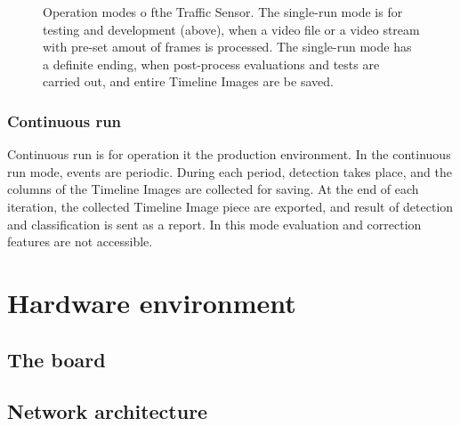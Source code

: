 \begin{figure}[!h]
	\centering
	
	\caption{Operation modes o fthe Traffic Sensor. The single-run mode is for testing and development (above), when a video file or a video stream with pre-set amout of frames is processed. The single-run mode has a definite ending, when post-process evaluations and tests are carried out, and entire Timeline Images are be saved. \label{fig:run_types}}
\end{figure}
\subsubsection{Continuous run}
Continuous run is for operation it the production environment.
In the continuous run mode, events are periodic. 
During each period, detection takes place, and the columns of the Timeline Images are collected for saving.
At the end of each iteration, the collected Timeline Image piece are exported, and result of detection and classification is sent as a report.
In this mode evaluation and correction features are not accessible.
\section{Hardware environment}
\subsection{The board}

\subsection{Network architecture}



